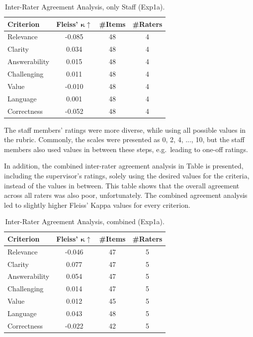 \begin{table}[H]
   \centering
   \caption{Inter-Rater Agreement Analysis, only Staff (Exp1a).} 
   \label{tab:iaa-staff-1a}
   \begin{tabular}{lccc}
        \toprule
        \textbf{Criterion} & \textbf{Fleiss' $\mathbf{\kappa}\uparrow$} & \textbf{\#Items} & \textbf{\#Raters} \\
        \midrule
        Relevance      & -0.085 & 48 & 4 \\
        Clarity        &  0.034 & 48 & 4 \\
        Answerability  &  0.015 & 48 & 4 \\
        Challenging    &  0.011 & 48 & 4 \\
        Value          & -0.010 & 48 & 4 \\
        Language       &  0.001 & 48 & 4 \\
        Correctness    & -0.052 & 48 & 4 \\
        \bottomrule
   \end{tabular}
\end{table}

\pagebreak

The staff members' ratings were more diverse, while using all possible values in the rubric. Commonly, the scales were presented as 0, 2, 4, ..., 10, but the staff members also used values in between these steps, e.g.\ leading to one-off ratings.

In addition, the combined inter-rater agreement analysis in Table  is presented, including the supervisor's ratings, solely using the desired values for the criteria, instead of the values in between. This table shows that the overall agreement across all raters was also poor, unfortunately. The combined agreement analysis led to slightly higher Fleiss' Kappa values for every criterion. 

\begin{table}[H]
   \centering
   \caption{Inter-Rater Agreement Analysis, combined (Exp1a).} 
   \label{tab:iaa-combined-1a}
   \begin{tabular}{lccc}
        \toprule
        \textbf{Criterion} & \textbf{Fleiss' $\mathbf{\kappa}\uparrow$} & \textbf{\#Items} & \textbf{\#Raters} \\
        \midrule
        Relevance      & -0.046 & 47 & 5 \\
        Clarity        &  0.077 & 47 & 5 \\
        Answerability  &  0.054 & 47 & 5 \\
        Challenging    &  0.014 & 47 & 5 \\
        Value          &  0.012 & 45 & 5 \\
        Language       &  0.043 & 48 & 5 \\
        Correctness    & -0.022 & 42 & 5 \\
        \bottomrule
   \end{tabular}
\end{table}

